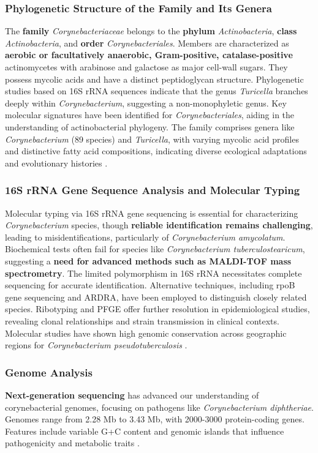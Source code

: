 \subsubsection*{Phylogenetic Structure of the Family and Its Genera}
The \textbf{family} \textit{Corynebacteriaceae} belongs to the \textbf{phylum} \textit{Actinobacteria}, \textbf{class} \textit{Actinobacteria}, and \textbf{order} \textit{Corynebacteriales}. Members are characterized as \textbf{aerobic or facultatively anaerobic, Gram-positive, catalase-positive} actinomycetes with arabinose and galactose as major cell-wall sugars. They possess mycolic acids and have a distinct peptidoglycan structure. Phylogenetic studies based on 16S rRNA sequences indicate that the genus \textit{Turicella} branches deeply within \textit{Corynebacterium}, suggesting a non-monophyletic genus. Key molecular signatures have been identified for \textit{Corynebacteriales}, aiding in the understanding of actinobacterial phylogeny. The family comprises genera like \textit{Corynebacterium} (89 species) and \textit{Turicella}, with varying mycolic acid profiles and distinctive fatty acid compositions, indicating diverse ecological adaptations and evolutionary histories \cite*{L8-MicroInFood}.

\subsubsection*{16S rRNA Gene Sequence Analysis and Molecular Typing}
Molecular typing via 16S rRNA gene sequencing is essential for characterizing \textit{Corynebacterium} species, though \textbf{reliable identification remains challenging}, leading to misidentifications, particularly of \textit{Corynebacterium amycolatum}. Biochemical tests often fail for species like \textit{Corynebacterium tuberculostearicum}, suggesting a \textbf{need for advanced methods such as MALDI-TOF mass spectrometry}. The limited polymorphism in 16S rRNA necessitates complete sequencing for accurate identification. Alternative techniques, including rpoB gene sequencing and ARDRA, have been employed to distinguish closely related species. Ribotyping and PFGE offer further resolution in epidemiological studies, revealing clonal relationships and strain transmission in clinical contexts. Molecular studies have shown high genomic conservation across geographic regions for \textit{Corynebacterium pseudotuberculosis} \cite*{L9-Coryn}.

\subsubsection*{Genome Analysis}
\textbf{Next-generation sequencing} has advanced our understanding of corynebacterial genomes, focusing on pathogens like \textit{Corynebacterium diphtheriae}. Genomes range from 2.28 Mb to 3.43 Mb, with 2000-3000 protein-coding genes. Features include variable G+C content and genomic islands that influence pathogenicity and metabolic traits \cite*{L8-MicroInFood}.

